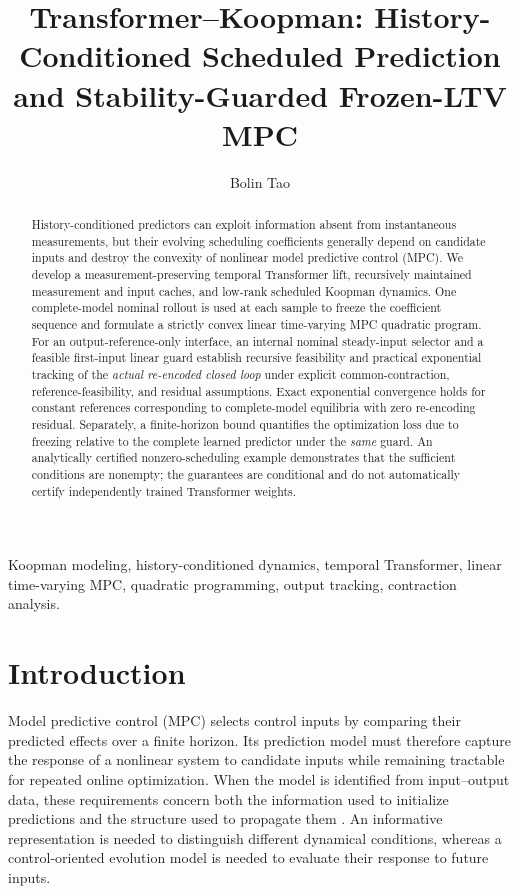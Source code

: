 \documentclass[journal]{IEEEtran}
\theoremstyle{plain}
\theoremstyle{definition}
\begin{document}
\title{Transformer--Koopman: History-Conditioned Scheduled Prediction and Stability-Guarded Frozen-LTV MPC}
\author{Bolin Tao}
\maketitle

{\color{blue}
\begin{abstract}
History-conditioned predictors can exploit information absent from instantaneous measurements, but their evolving scheduling coefficients generally depend on candidate inputs and destroy the convexity of nonlinear model predictive control (MPC). We develop a measurement-preserving temporal Transformer lift, recursively maintained measurement and input caches, and low-rank scheduled Koopman dynamics. One complete-model nominal rollout is used at each sample to freeze the coefficient sequence and formulate a strictly convex linear time-varying MPC quadratic program. For an output-reference-only interface, an internal nominal steady-input selector and a feasible first-input linear guard establish recursive feasibility and practical exponential tracking of the \emph{actual re-encoded closed loop} under explicit common-contraction, reference-feasibility, and residual assumptions. Exact exponential convergence holds for constant references corresponding to complete-model equilibria with zero re-encoding residual. Separately, a finite-horizon bound quantifies the optimization loss due to freezing relative to the complete learned predictor under the \emph{same} guard. An analytically certified nonzero-scheduling example demonstrates that the sufficient conditions are nonempty; the guarantees are conditional and do not automatically certify independently trained Transformer weights.
\end{abstract}
\begin{IEEEkeywords}
Koopman modeling, history-conditioned dynamics, temporal Transformer, linear time-varying MPC, quadratic programming, output tracking, contraction analysis.
\end{IEEEkeywords}
}

\section{Introduction}
\label{sec:introduction}
Model predictive control (MPC) selects control inputs by comparing their predicted effects over a finite horizon. Its prediction model must therefore capture the response of a nonlinear system to candidate inputs while remaining tractable for repeated online optimization. When the model is identified from input--output data, these requirements concern both the information used to initialize predictions and the structure used to propagate them \cite{ljung1999system,nelles2020nonlinear,forgione2021dynonet}. An informative representation is needed to distinguish different dynamical conditions, whereas a control-oriented evolution model is needed to evaluate their response to future inputs.
\end{document}
